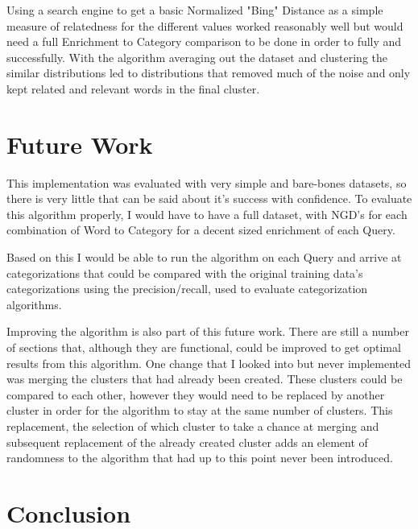 \documentclass[letterpaper]{article}
\begin{document}
Using a search engine to get a basic Normalized "Bing" Distance as a simple measure of relatedness for the different values worked reasonably well but would need a full Enrichment to Category comparison to be done in order to fully and successfully.
With the algorithm averaging out the dataset and clustering the similar distributions led to distributions that removed much of the noise and only kept related and relevant words in the final cluster. 

\section{Future Work}

This implementation was evaluated with very simple and bare-bones datasets, so there is very little that can be said about it's success with confidence. 
To evaluate this algorithm properly, I would have to have a full dataset, with NGD's for each combination of Word to Category for a decent sized enrichment of each Query.

Based on this I would be able to run the algorithm on each Query and arrive at categorizations that could be compared
with the original training data's categorizations using the precision/recall, used to evaluate categorization algorithms. 

Improving the algorithm is also part of this future work. There are still a number of sections that, although they are functional, could be improved to get optimal results from this algorithm. 
One change that I looked into but never implemented was merging the clusters that had already been created. These clusters could be compared to each other, however they would need to be replaced by another cluster in order for the algorithm to stay at the same number of clusters. This replacement, the selection of which cluster to take a chance at merging and subsequent replacement of the already created cluster adds an element of randomness to the algorithm that had up to this point never been introduced. 


\section{Conclusion}
\end{document}
